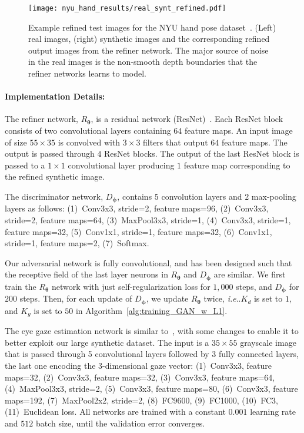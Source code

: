 \documentclass[10pt,twocolumn,letterpaper]{article}
\makeatletter
\DeclareRobustCommand\onedot{\futurelet\@let@token\@onedot}
\def\@onedot{\ifx\@let@token.\else.\null\fi\xspace}
\def\ie{\emph{i.e}\onedot} \def\Ie{\emph{I.e}\onedot}
\makeatother
\begin{document}
\begin{figure*}[t]
\centering
\texttt{[image: nyu\_hand\_results/real\_synt\_refined.pdf]} 
\caption{Example refined test images for the NYU hand pose dataset~\cite{tompson14NYU}. 
(Left) real images, (right) synthetic images and the corresponding refined output images from the refiner network. 
The major source of noise in the real images is the non-smooth depth boundaries that the refiner networks learns to model. 
}
\vspace{-0.2cm}
\label{fig:results_qualitative_hand}
\end{figure*}


\paragraph{Implementation Details:} 
The refiner network, $R_{\boldsymbol \theta}$, is a residual network (ResNet)~\cite{He2015}. 
Each ResNet block consists of two convolutional layers containing $64$ feature maps. 
An input image of size $55 \times 35$ is convolved with $3 \times 3$  filters that output $64$ feature maps. 
The output is passed through $4$ ResNet blocks. The output of the last ResNet block is passed to a $1 \times 1$ convolutional layer producing $1$ feature map corresponding to the refined synthetic image.

The discriminator network, $D_{\boldsymbol \phi}$, contains $5$ convolution layers and $2$ max-pooling layers as follows: 
(1)~Conv3x3, stride=2, feature maps=96, 
(2)~Conv3x3, stride=2, feature maps=64, 
(3)~MaxPool3x3, stride=1, 
(4)~Conv3x3, stride=1, feature maps=32,  
(5)~Conv1x1, stride=1, feature maps=32,  
(6)~Conv1x1, stride=1, feature maps=2,  
(7)~Softmax. 

Our adversarial network is fully convolutional, and has been designed such that the receptive field of the last layer neurons in $R_{\boldsymbol \theta}$ and $D_{\boldsymbol \phi}$ are similar.
We first train the $R_{\boldsymbol \theta}$ network with just self-regularization loss for $1,000$ steps, and $D_{\boldsymbol \phi}$ for $200$ steps. 
Then, for each update of $D_{\boldsymbol \phi}$, we update $R_{\boldsymbol \theta}$ twice, \ie $K_d$ is set to $1$, and $K_g$ is set to $50$ in Algorithm~\ref{alg:training_GAN_w_L1}.

The eye gaze estimation network is similar to~\cite{Zhang15a}, with some changes to enable it to better exploit our large synthetic dataset.
The input is a $35 \times 55$ grayscale image that is passed through 5 convolutional layers followed by 3 fully connected layers,  the last one encoding the 3-dimensional gaze vector:
(1)~Conv3x3, feature maps=32, 
(2)~Conv3x3, feature maps=32, 
(3)~Conv3x3, feature maps=64, 
(4)~MaxPool3x3, stride=2, 
(5)~Conv3x3, feature maps=80,  
(6)~Conv3x3, feature maps=192,  
(7)~MaxPool2x2, stride=2,  
(8)~FC9600,  
(9)~FC1000, 
(10)~FC3, 
(11)~Euclidean loss.
All networks are trained with a constant $0.001$ learning rate and $512$ batch size, until the validation error converges.
\end{document}
